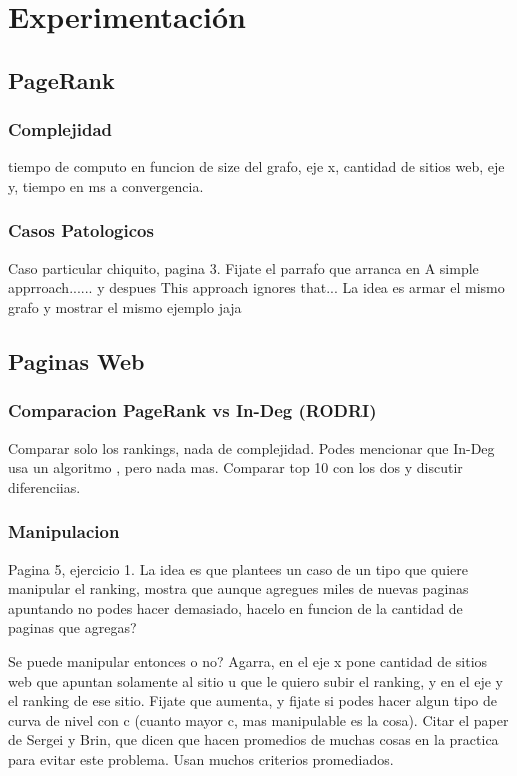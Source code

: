 \section{Experimentación}

\subsection{PageRank}
\subsubsection{Complejidad}
tiempo de computo en funcion de size del grafo, eje x, cantidad de sitios web, eje y, tiempo en ms a convergencia.

\subsubsection{Casos Patologicos}
Caso particular chiquito, pagina 3. Fijate el parrafo que arranca en A simple apprroach...... y despues This approach ignores that... La idea es armar el mismo grafo y mostrar el mismo ejemplo jaja

\subsection{Paginas Web}

\subsubsection{Comparacion PageRank vs In-Deg (RODRI)}
Comparar solo los rankings, nada de complejidad. Podes mencionar que In-Deg usa un algoritmo , pero nada mas. Comparar top 10 con los dos y discutir diferenciias.

\subsubsection{Manipulacion}
Pagina 5, ejercicio 1. La idea es que plantees un caso de un tipo que quiere manipular el ranking, mostra que aunque agregues miles de nuevas paginas apuntando no podes hacer demasiado, hacelo en funcion de la cantidad de paginas que agregas?

Se puede manipular entonces o no? Agarra, en el eje x pone cantidad de sitios web que apuntan solamente al sitio u que le quiero subir el ranking, y en el eje y el ranking de ese sitio. Fijate que aumenta, y fijate si podes hacer algun tipo de curva de nivel con c (cuanto mayor c, mas manipulable es la cosa). Citar el paper de Sergei y Brin, que dicen que hacen promedios de muchas cosas en la practica para evitar este problema. Usan muchos criterios promediados.

